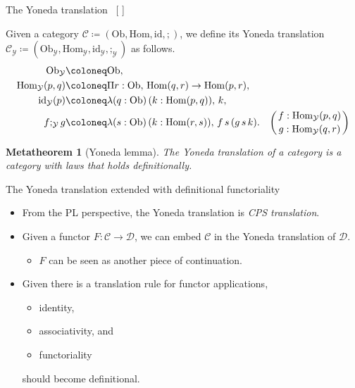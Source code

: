 \documentclass[12pt, aspectratio=169]{beamer}
\let\OrigCite\cite
\renewcommand*\cite[2][]{%
  {%
    \color{_note}%
    [\if\relax\detokenize{#1}\relax
      \OrigCite{#2}%
    \else
      \OrigCite[#1]{#2}%
    \fi]
  }%
}
\newtheorem{metatheorem}[theorem]{Metatheorem}
\begin{document}
\begin{frame}{The Yoneda translation~\cite{DBLP:conf/lics/JaberLPST16}}

  \small

  \begin{definition}
    Given a category $\mathcal{C} \coloneq (\mathrm{Ob}, \mathrm{Hom}, \mathrm{id}, ;)$,
    we define its Yoneda translation
    $\mathcal{C}_{\mathcal{Y}} \coloneq
     (\mathrm{Ob}_{\mathcal{Y}}, \mathrm{Hom}_{\mathcal{Y}},
      \mathrm{id}_{\mathcal{Y}}, ;_{\mathcal{Y}})$
    as follows.
    \begin{align*}
      \mathrm{Ob}_{\mathcal{Y}}
      &\coloneq \mathrm{Ob}, \\
      \mathrm{Hom}_{\mathcal{Y}}(p, q)
      &\coloneq \Pi r : \mathrm{Ob},\, \mathrm{Hom}(q, r) \to \mathrm{Hom}(p, r), \\
      \mathrm{id}_{\mathcal{Y}}(p)
      &\coloneq \lambda (q : \mathrm{Ob}) \, (k : \mathrm{Hom}(p, q)),\, k, \\
      f ;_{\mathcal{Y}} g
      &\coloneq \lambda (s : \mathrm{Ob}) \, (k : \mathrm{Hom}(r, s)),\, f \, s \, (g \, s \, k).
      & \left(\genfrac{}{}{0pt}{}{f : \mathrm{Hom}_{\mathcal{Y}}(p, q)}{g : \mathrm{Hom}_{\mathcal{Y}}(q, r)}\right)
    \end{align*}
  \end{definition}

  \begin{metatheorem}[Yoneda lemma]
    The Yoneda translation of a category is a category with laws that holds definitionally.
  \end{metatheorem}

\end{frame}

\begin{frame}{The Yoneda translation extended with definitional functoriality}

  \begin{itemize}
  \item From the PL perspective, the Yoneda translation is \emph{CPS translation}.
  \item Given a functor $F : \mathcal{C} \to \mathcal{D}$, we can embed $\mathcal{C}$ in the Yoneda
    translation of $\mathcal{D}$.
    \begin{itemize}
    \item $F$ can be seen as another piece of continuation.
    \end{itemize}
  \item Given there is a translation rule for functor applications,
    \begin{itemize}
    \item identity,
    \item associativity, and
    \item functoriality
    \end{itemize}
    should become definitional.
  \end{itemize}

\end{frame}
\end{document}
